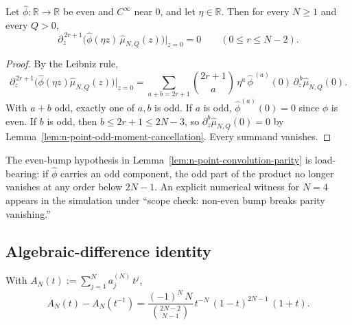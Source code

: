 \begin{lemma}
\label{lem:n-point-convolution-parity}
Let \(\widehat\phi:\mathbb R\to\mathbb R\) be even and \(C^\infty\) near
\(0\), and let \(\eta\in\mathbb R\).  Then for every \(N\ge 1\) and
every \(Q>0\),
\begin{equation}
\label{eq:n-point-convolution-vanishing}
        \partial_z^{\,2r+1}
        \bigl(\widehat\phi(\eta z)\,\widehat\mu_{N,Q}(z)\bigr)
        \big|_{z=0}
        = 0
        \qquad (0 \le r \le N - 2).
\end{equation}
\end{lemma}

\begin{proof}
By the Leibniz rule,
\[
        \partial_z^{\,2r+1}
        \bigl(\widehat\phi(\eta z)\widehat\mu_{N,Q}(z)\bigr)\big|_{z=0}
        = \sum_{a+b = 2r+1}\binom{2r+1}{a}\,
          \eta^a\,\widehat\phi^{\,(a)}(0)\,
          \partial_z^{\,b}\widehat\mu_{N,Q}(0).
\]
With \(a+b\) odd, exactly one of \(a, b\) is odd.  If \(a\) is odd,
\(\widehat\phi^{(a)}(0)=0\) since \(\widehat\phi\) is even.  If \(b\) is
odd, then \(b\le 2r+1\le 2N-3\), so
\(\partial_z^b\widehat\mu_{N,Q}(0)=0\) by
Lemma~\ref{lem:n-point-odd-moment-cancellation}.  Every summand vanishes.
\end{proof}

\begin{remark}
\label{rem:n-point-even-bump-necessary}
The even-bump hypothesis in
Lemma~\ref{lem:n-point-convolution-parity} is load-bearing: if
\(\widehat\phi\) carries an odd component, the odd part of the product
no longer vanishes at any order below \(2N-1\).  An explicit numerical
witness for \(N=4\) appears in the simulation under
``scope check: non-even bump breaks parity vanishing.''
\end{remark}

\subsection{Algebraic-difference identity}
\label{subsec:n-point-difference-identity}

\begin{lemma}
\label{lem:A-N-difference}
With \(A_N(t):=\sum_{j=1}^N a_j^{(N)}\, t^j\),
\begin{equation}
\label{eq:A-N-difference}
        A_N(t) - A_N(t^{-1})
        = \frac{(-1)^N\,N}{\binom{2N-2}{N-1}}\,
          t^{-N}\,(1-t)^{2N-1}\,(1+t).
\end{equation}
\end{lemma}


